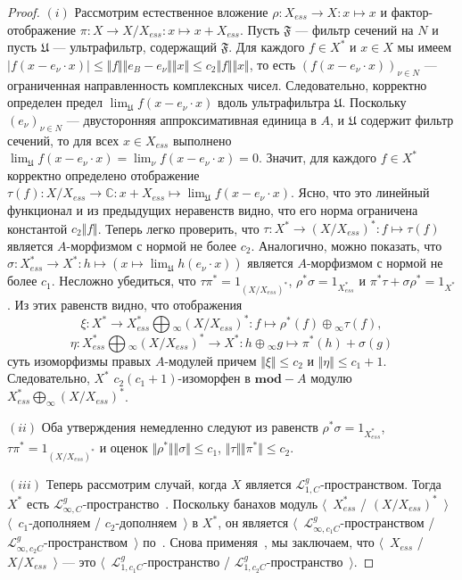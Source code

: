 \documentclass[12pt]{article}
\begin{document}
\begin{proof} $(i)$ Рассмотрим естественное вложение $\rho:X_{ess}\to X:x\mapsto
x$ и фактор-отображение $\pi:X\to X/X_{ess}:x\mapsto x+X_{ess}$. Пусть
$\mathfrak{F}$ --- фильтр сечений на $N$ и пусть $\mathfrak{U}$ ---
ультрафильтр, содержащий $\mathfrak{F}$. Для каждого $f\in X ^*$ и $x\in X $ мы
имеем $|f(x-e_\nu\cdot x)|\leq\Vert f\Vert\Vert e_B - e_\nu\Vert\Vert x\Vert\leq
c_2\Vert f\Vert\Vert x\Vert$, то есть ${(f(x-e_\nu\cdot x))}_{\nu\in N}$ ---
ограниченная направленность комплексных чисел. Следовательно, корректно
определен предел $\lim_{\mathfrak{U}}f(x-e_\nu\cdot x)$ вдоль ультрафильтра
$\mathfrak{U}$. Поскольку ${(e_\nu)}_{\nu\in N}$ --- двусторонняя
аппроксимативная единица в $A$, и $\mathfrak{U}$ содержит фильтр сечений, то для
всех $x\in X_{ess}$ выполнено $\lim_{\mathfrak{U}}f(x-e_\nu\cdot
x)=\lim_{\nu}f(x-e_\nu\cdot x)=0$. Значит, для каждого $f\in X ^*$ корректно
определено отображение $\tau(f):X /X_{ess}\to \mathbb{C}:x+X_{ess}\mapsto
\lim_{\mathfrak{U}} f(x-e_\nu\cdot x)$. Ясно, что это линейный функционал и из
предыдущих неравенств видно, что его норма ограничена константой $c_2\Vert
f\Vert$. Теперь легко проверить, что $\tau:X^*\to {(X/ X_{ess})}^*:f\mapsto
\tau(f)$ является $A$-морфизмом с нормой не более $c_2$. Аналогично, можно
показать, что $\sigma:X_{ess}^*\to X^*:h\mapsto(x\mapsto
\lim_{\mathfrak{U}}h(e_\nu\cdot x))$ является $A$-морфизмом с нормой не более
$c_1$. Несложно убедиться, что $\tau \pi^*=1_{{(X/X_{ess})}^*}$,
$\rho^*\sigma=1_{X_{ess}^*}$ и  $\pi^*\tau+\sigma\rho^*=1_{X^*}$. Из этих
равенств видно, что отображения
\[
\xi
:X^*\to X_{ess}^*\bigoplus{}_\infty {(X/X_{ess})}^*
:f\mapsto \rho^*(f)\oplus{}_\infty \tau(f),
\]
\[
\eta:X_{ess}^*\bigoplus{}_\infty {(X/X_{ess})}^*
\to X^*:h\oplus{}_\infty g\mapsto \pi^*(h)+\sigma(g)
\]
суть изоморфизмы правых $A$-модулей причем $\Vert\xi \Vert\leq c_2$ и $\Vert
\eta\Vert\leq c_1+1$. Следовательно, $X^*$ $c_2(c_1+1)$-изоморфен в
$\mathbf{mod}-A$ модулю $X_{ess}^*\bigoplus_\infty {(X/X_{ess})}^*$.

$(ii)$ Оба утверждения немедленно следуют из равенств
$\rho^*\sigma=1_{X_{ess}^*}$, $\tau \pi^*=1_{{(X/X_{ess})}^*}$ и оценок $\Vert
\rho^*\Vert\Vert \sigma\Vert\leq c_1$, $\Vert\tau\Vert\Vert \pi^*\Vert\leq c_2$.

$(iii)$ Теперь рассмотрим случай, когда $X$ является
$\mathcal{L}_{1,C}^g$-пространством. Тогда $X^*$ есть
$\mathcal{L}_{\infty,C}^g$-пространство~\cite[следствие
23.2.1(1)]{DefFloTensNorOpId}. Поскольку банахов модуль $\langle$~$X_{ess}^*$ /
${(X/X_{ess})}^*$~$\rangle$ $\langle$~$c_1$-дополняем /
$c_2$-дополняем~$\rangle$ в $X^*$, он является
$\langle$~$\mathcal{L}_{\infty,c_1C}^g$-пространством /
$\mathcal{L}_{\infty,c_2C}^g$-пространством~$\rangle$ по~\cite[следствие
23.2.1(1)]{DefFloTensNorOpId}. Снова применяя~\cite[следствие
23.2.1(1)]{DefFloTensNorOpId}, мы заключаем, что $\langle$~$X_{ess}$  /
$X/X_{ess}$~$\rangle$ --- это $\langle$~$\mathcal{L}_{1,c_1C}^g$-пространство /
$\mathcal{L}_{1,c_2C}^g$-пространство~$\rangle$.
\end{proof}
\end{document}
